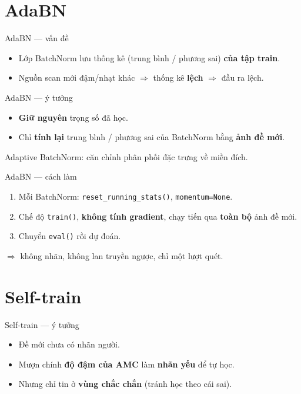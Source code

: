 \documentclass{beamer}
\newcommand{\hl}[1]{\textbf{#1}}
\begin{document}
\section{AdaBN}

\begin{frame}{AdaBN --- vấn đề}
\vspace{0.2cm}
\begin{itemize}
    \item Lớp BatchNorm lưu thống kê (trung bình / phương sai) \hl{của tập train}.
    \item Nguồn scan mới đậm/nhạt khác $\Rightarrow$ thống kê \hl{lệch} $\Rightarrow$ đầu ra lệch.
\end{itemize}
\end{frame}

\begin{frame}{AdaBN --- ý tưởng}
\begin{itemize}
    \item \hl{Giữ nguyên} trọng số đã học.
    \item Chỉ \hl{tính lại} trung bình / phương sai của BatchNorm bằng \hl{ảnh đề mới}.
\end{itemize}
\vspace{0.3cm}
{\footnotesize Adaptive BatchNorm: căn chỉnh phân phối đặc trưng về miền đích.}
\end{frame}

\begin{frame}{AdaBN --- cách làm}
\begin{enumerate}
    \item Mỗi BatchNorm: \texttt{reset\_running\_stats()}, \texttt{momentum=None}.
    \item Chế độ \texttt{train()}, \hl{không tính gradient}, chạy tiến qua \hl{toàn bộ} ảnh đề mới.
    \item Chuyển \texttt{eval()} rồi dự đoán.
\end{enumerate}
\vspace{0.3cm}
{\footnotesize $\Rightarrow$ không nhãn, không lan truyền ngược, chỉ một lượt quét.}
\end{frame}

\section{Self-train}

\begin{frame}{Self-train --- ý tưởng}
\vspace{0.2cm}
\begin{itemize}
    \item Đề mới chưa có nhãn người.
    \item Mượn chính \hl{độ đậm của AMC} làm \hl{nhãn yếu} để tự học.
    \item Nhưng chỉ tin ở \hl{vùng chắc chắn} (tránh học theo cái sai).
\end{itemize}
\end{frame}
\end{document}

